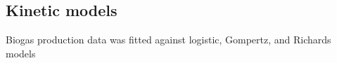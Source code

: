 \subsection{Kinetic models}
Biogas production data was fitted against logistic, Gompertz, and
Richards models 